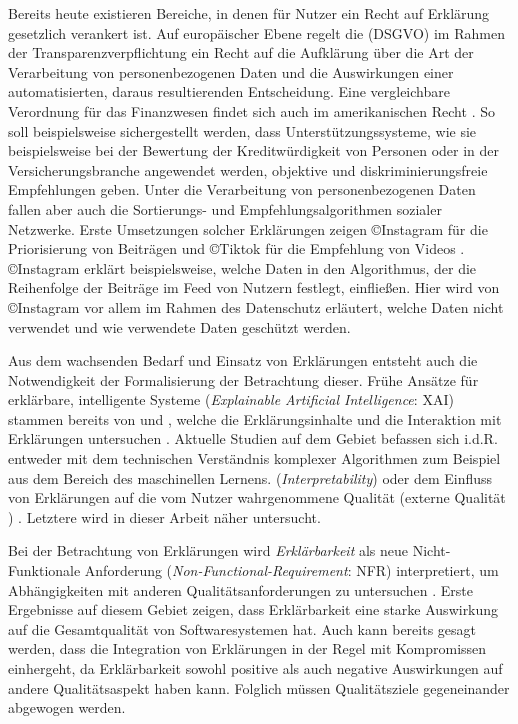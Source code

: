 Bereits heute existieren Bereiche, in denen für Nutzer ein \glqq Recht auf Erklärung\grqq{} gesetzlich verankert ist. Auf europäischer Ebene regelt die  (DSGVO) \cite{eu_verordnung_2016} im Rahmen der Transparenzverpflichtung ein Recht auf die Aufklärung über die Art der Verarbeitung von personenbezogenen Daten und die Auswirkungen einer automatisierten, daraus resultierenden Entscheidung. Eine vergleichbare Verordnung für das Finanzwesen findet sich auch im amerikanischen Recht \cite{cfpb_regulation_2018}. So soll beispielsweise sichergestellt werden, dass Unterstützungssysteme, wie sie beispielsweise bei der Bewertung der Kreditwürdigkeit von Personen oder in der Versicherungsbranche angewendet werden, objektive und diskriminierungsfreie Empfehlungen geben. Unter die Verarbeitung von personenbezogenen Daten fallen aber auch die Sortierungs- und Empfehlungsalgorithmen sozialer Netzwerke. Erste Umsetzungen solcher Erklärungen zeigen \copyright Instagram für die Priorisierung von Beiträgen und \copyright Tiktok für die Empfehlung von Videos \cite{mosseri_shedding_2021,tiktok_technology_limited_how_2021}. \copyright Instagram erklärt beispielsweise, welche Daten in den Algorithmus, der die Reihenfolge der Beiträge im Feed von Nutzern festlegt, einfließen. Hier wird von \copyright Instagram vor allem im Rahmen des Datenschutz erläutert, welche Daten nicht verwendet und wie verwendete Daten geschützt werden.

Aus dem wachsenden Bedarf und Einsatz von Erklärungen entsteht auch die Notwendigkeit der Formalisierung der Betrachtung dieser. Frühe Ansätze für erklärbare, intelligente Systeme (\textit{Explainable Artificial Intelligence}: XAI) stammen bereits von \citeauthor{byrne1991construction} und \citeauthor{cawsey1991generating}, welche die Erklärungsinhalte \cite{byrne1991construction} und die Interaktion mit Erklärungen untersuchen \cite{cawsey1991generating}. Aktuelle Studien auf dem Gebiet befassen sich i.d.R. entweder mit dem technischen Verständnis komplexer Algorithmen zum Beispiel aus dem Bereich des maschinellen Lernens. (\textit{Interpretability}) \cite{gilpin_explaining_2018, fong_interpretable_2017, samek_towards_2019} oder dem Einfluss von Erklärungen auf die vom Nutzer wahrgenommene Qualität (externe Qualität \cite{international2011iso}) \cite{nunes_systematic_2017,kouki_user_2017,chazette_end-users_nodate}. Letztere wird in dieser Arbeit näher untersucht.

Bei der Betrachtung von Erklärungen wird \textit{Erklärbarkeit} als neue Nicht-Funktionale Anforderung (\textit{Non-Functional-Requirement}: NFR) interpretiert, um Abhängigkeiten mit anderen Qualitätsanforderungen zu untersuchen \cite{kohl_explainability_2019, chazette2020explainability}. Erste Ergebnisse auf diesem Gebiet zeigen, dass Erklärbarkeit eine starke Auswirkung auf die Gesamtqualität von Softwaresystemen hat. Auch kann bereits gesagt werden, dass die Integration von Erklärungen in der Regel mit Kompromissen einhergeht, da Erklärbarkeit sowohl positive als auch negative Auswirkungen auf andere Qualitätsaspekt haben kann. Folglich müssen Qualitätsziele gegeneinander abgewogen werden.

